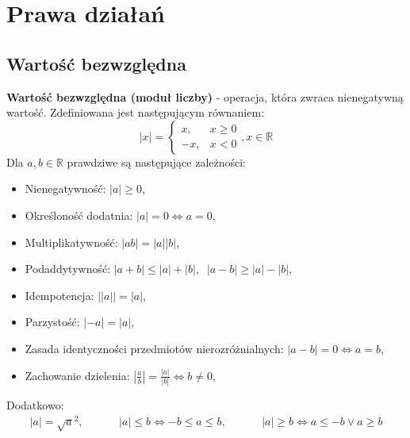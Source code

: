 \documentclass[14pt,a4paper]{extarticle}
\begin{document}
\newpage
\renewcommand{\arraystretch}{1.2}
\setlength{\arrayrulewidth}{0.5mm}

\section{Prawa działań}
\subsection{Wartość bezwzględna}
\textbf{Wartość bezwzględna (moduł liczby)} - operacja, która zwraca nienegatywną wartość. Zdefiniowana jest następującym równaniem:
\begin{equation*}
\lvert x \rvert = \left\{
   \begin{array}{ll}
      x, & x \geq 0 \\
      -x, & x < 0
   \end{array}
\right., x \in \mathbb{R}
\end{equation*}
Dla $a, b \in \mathbb{R}$ prawdziwe są następujące zależności:
\begin{itemize}
   \item Nienegatywność: $\lvert a\rvert \geq 0$,
   \item Określoność dodatnia: $\lvert a \rvert = 0 \Leftrightarrow a = 0$,
   \item Multiplikatywność: $\lvert ab\rvert = \lvert a\rvert\lvert b\rvert$,
   \item Podaddytywność: $\lvert a + b\rvert \leq \lvert a\rvert + \lvert b \rvert,\;\; \lvert a - b\rvert \geq \lvert a\rvert - \lvert b \rvert$,
   \item Idempotencja: $\lvert\lvert a \rvert\rvert = \lvert a \rvert$,
   \item Parzystość: $\lvert -a\rvert = \lvert a\rvert$,
   \item Zasada identyczności przedmiotów nierozróżnialnych: $\lvert a - b \rvert = 0 \Leftrightarrow a = b$,
   \item Zachowanie dzielenia: $\left\lvert\frac{\displaystyle a}{\displaystyle b}\right\rvert = \frac{\displaystyle \lvert a\rvert}{\displaystyle \lvert b \rvert} \Leftrightarrow b \neq 0$,
\end{itemize}
Dodatkowo:
\begin{equation*}
\begin{array}{ccc}
   \lvert a\rvert = \sqrt{a}^{2}, &\hspace{1cm} \lvert a \rvert \leq b \Leftrightarrow -b \leq a \leq b, &\hspace{1cm} \lvert a \rvert \geq b \Leftrightarrow a \leq -b \lor a \geq b \\
\end{array}
\end{equation*}
\end{document}
